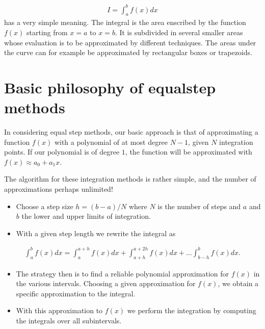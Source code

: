 \documentclass[letterpaper,10pt,english]{sphinxmanual}
\begin{document}
\begin{equation*}
\begin{split}
\begin{equation}
   I=\int_a^bf(x) dx
\label{eq:integraldef} \tag{41}
\end{equation}
\end{split}
\end{equation*}
has a very simple meaning. The integral is the
area enscribed by the function \(f(x)\) starting from \(x=a\) to  \(x=b\). It is subdivided in several smaller areas whose evaluation is to  be approximated by different techniques. The areas under the curve can for example  be approximated by rectangular boxes or trapezoids.


\section{Basic philosophy of equal\sphinxhyphen{}step methods}
\label{\detokenize{chapter1:basic-philosophy-of-equal-step-methods}}
In considering equal step  methods, our basic approach is that of approximating
a function \(f(x)\) with a polynomial of at most
degree \(N-1\), given \(N\) integration points. If our polynomial is of degree \(1\),
the function will be approximated with \(f(x)\approx a_0+a_1x\).

The algorithm for these integration methods  is rather simple, and the number of approximations perhaps  unlimited!
\begin{itemize}
\item {} 
Choose a step size \(h=(b-a)/N\)  where \(N\) is the number of steps and \(a\) and \(b\) the lower and upper limits of integration.

\item {} 
With a given step length we rewrite the integral as

\end{itemize}
\begin{equation*}
\begin{split}
\int_a^bf(x) dx= \int_a^{a+h}f(x)dx + \int_{a+h}^{a+2h}f(x)dx+\dots \int_{b-h}^{b}f(x)dx.
\end{split}
\end{equation*}\begin{itemize}
\item {} 
The strategy then is to find a reliable polynomial approximation   for \(f(x)\) in the various intervals.  Choosing a given approximation for  \(f(x)\), we obtain a specific approximation to the  integral.

\item {} 
With this approximation to \(f(x)\) we perform the integration by computing the integrals over all subintervals.

\end{itemize}
\end{document}
